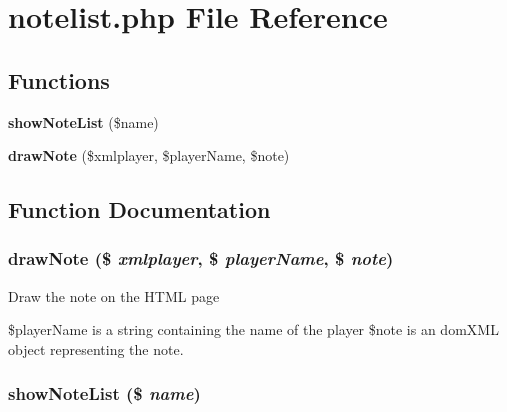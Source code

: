 \section{notelist.php File Reference}
\label{notelist_8php}


\subsection*{Functions}
\begin{CompactItemize}
\item 
{\bf show\-Note\-List} (\$name)
\item 
{\bf draw\-Note} (\$xmlplayer, \$player\-Name, \$note)
\end{CompactItemize}


\subsection{Function Documentation}
\subsubsection{\setlength{\rightskip}{0pt plus 5cm}draw\-Note (\$ {\em xmlplayer}, \$ {\em player\-Name}, \$ {\em note})}\label{notelist_8php_9872e8baca617471255a6276bcf1747f}


Draw the note on the HTML page

\$player\-Name is a string containing the name of the player \$note is an dom\-XML object representing the note. 
\subsubsection{\setlength{\rightskip}{0pt plus 5cm}show\-Note\-List (\$ {\em name})}\label{notelist_8php_ee9915f04b734f94edc38f248bdf47bf}


